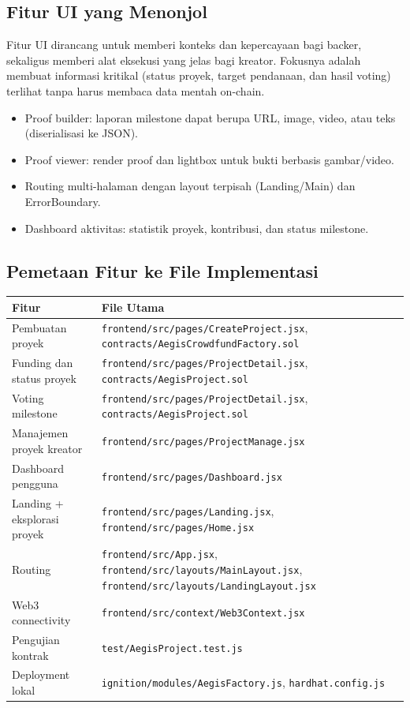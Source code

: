 \documentclass[12pt]{article}
\begin{document}
\subsection{Fitur UI yang Menonjol}
Fitur UI dirancang untuk memberi konteks dan kepercayaan bagi backer, sekaligus memberi alat eksekusi yang jelas bagi kreator. Fokusnya adalah membuat informasi kritikal (status proyek, target pendanaan, dan hasil voting) terlihat tanpa harus membaca data mentah on-chain.
\begin{itemize}[leftmargin=1.2em]
  \item Proof builder: laporan milestone dapat berupa URL, image, video, atau teks (diserialisasi ke JSON).
  \item Proof viewer: render proof dan lightbox untuk bukti berbasis gambar/video.
  \item Routing multi-halaman dengan layout terpisah (Landing/Main) dan ErrorBoundary.
  \item Dashboard aktivitas: statistik proyek, kontribusi, dan status milestone.
\end{itemize}

\subsection{Pemetaan Fitur ke File Implementasi}
\begin{longtable}{p{} p{}}
	\toprule
	\textbf{Fitur} & \textbf{File Utama} \\
	\midrule
Pembuatan proyek & \texttt{frontend/src/pages/CreateProject.jsx}, \texttt{contracts/AegisCrowdfundFactory.sol} \\
Funding dan status proyek & \texttt{frontend/src/pages/ProjectDetail.jsx}, \texttt{contracts/AegisProject.sol} \\
Voting milestone & \texttt{frontend/src/pages/ProjectDetail.jsx}, \texttt{contracts/AegisProject.sol} \\
Manajemen proyek kreator & \texttt{frontend/src/pages/ProjectManage.jsx} \\
Dashboard pengguna & \texttt{frontend/src/pages/Dashboard.jsx} \\
Landing + eksplorasi proyek & \texttt{frontend/src/pages/Landing.jsx}, \texttt{frontend/src/pages/Home.jsx} \\
Routing & \texttt{frontend/src/App.jsx}, \texttt{frontend/src/layouts/MainLayout.jsx}, \texttt{frontend/src/layouts/LandingLayout.jsx} \\
Web3 connectivity & \texttt{frontend/src/context/Web3Context.jsx} \\
Pengujian kontrak & \texttt{test/AegisProject.test.js} \\
Deployment lokal & \texttt{ignition/modules/AegisFactory.js}, \texttt{hardhat.config.js} \\
\bottomrule
\end{longtable}
\end{document}
